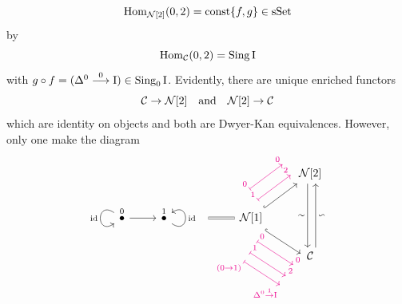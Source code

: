     \begin{equation*}
        \operatorname{Hom}_{\mathcal{N}[2]}(0, 2) = \operatorname{const} \{f, g\} \in \operatorname{sSet}
    \end{equation*}
    by 
    \begin{equation*}
        \operatorname{Hom}_{\mathcal{C}}(0, 2) = \operatorname{Sing} \mathrm{I}
    \end{equation*}
    with $g \circ f = (\Delta^0 \overset{0}{\longrightarrow} \mathrm{I}) \in \operatorname{Sing}_0 \mathrm{I}$.
    Evidently, there are unique enriched functors
    \begin{equation*}
        \mathcal{C} \to \mathcal{N}[2] \quad \text{and} \quad \mathcal{N}[2] \to \mathcal{C}
    \end{equation*}
    which are identity on objects and both are Dwyer-Kan equivalences. However, only one make the diagram
    \begin{equation*}
        \begin{tikzcd}
                                                                      &                                                            &                                   &                                                                                                                                                                                                                                                   & {\mathcal{N}[2]} \arrow[dd, "\sim"', shift right] \\
            \overset{0}{\bullet} \arrow["\id"', loop, distance=2em, in=215, out=145] \arrow[r] & \overset{1}{\bullet} \arrow["\id"', loop, distance=2em, in=35, out=325] & {} \arrow[r, equal] & {\mathcal{N}[1]} \arrow[rd, magenta, maps to, shift right=15, swap, , "(0 \to 1)" at start, "\Delta^0 \overset{1}{\to} \mathrm{I}" at end] \arrow[ru, magenta, maps to, shift left=9, "0" at start, "0" at end] \arrow[ru, magenta, maps to, shift left=4, "1" at start, "2" at end] \arrow[ru, hook] \arrow[rd, magenta, maps to, shift right=11, , "1" at start, "2" at end] \arrow[rd, magenta, maps to, shift right=6, "0" at start, "0" at end] \arrow[rd, hook, shift right] &                                                   \\
                                                                      &                                                            &                                   &                                                                                                                                                                                                                                                   & \Cc \arrow[uu, "\backsim"', shift right=2]       
        \end{tikzcd}
    \end{equation*}
